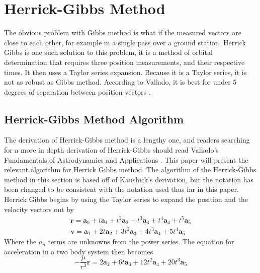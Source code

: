 \documentclass[12pt]{article}
\begin{document}
	\section{Herrick-Gibbs Method}
	The obvious problem with Gibbs method is what if the measured vectors are close to each other, for example in a single pass over a ground station. Herrick Gibbs is one such solution to this problem, it is a method of orbital determination that requires three position measurements, and their respective times. It then uses a Taylor series expansion. Because it is a Taylor series, it is not as robust as Gibbs method. According to Vallado, it is best for under 5 degrees of separation between position vectors \cite{vallado2007fundamentals}.
	
	\subsection{Herrick-Gibbs Method Algorithm}
	The derivation of Herrick-Gibbs method is a lengthy one, and readers searching for a more in depth derivation of Herrick-Gibbs should read Vallado's Fundamentals of Astrodynamics and Applications \cite{vallado2007fundamentals}. This paper will present the relevant algorithm for Herrick Gibbs method. The algorithm of the Herrick-Gibbs method in this section is based off of Kaushick's derivation\cite{Kaushick}, but the notation has been changed to be consistent with the notation used thus far in this paper. Herrick Gibbs begins by using the Taylor series to expand the position and the velocity vectors out by 
	\begin{equation}
	\begin{array} { l } { \mathbf { r } = \mathbf { a } _ { 0 } + t \mathbf { a } _ { 1 } + t ^ { 2 } \mathbf { a } _ { 2 } + t ^ { 3 } \mathbf { a } _ { 3 } + t ^ { 4 } \mathbf { a } _ { 4 } + t ^ { 5 } \mathbf { a } _ { 5 } } \\ { \mathbf { v } = \mathbf { a } _ { 1 } + 2 t \mathbf { a } _ { 2 } + 3 t ^ { 2 } \mathbf { a } _ { 3 } + 4 t ^ { 3 } \mathbf { a } _ { 4 } + 5 t ^ { 4 } \mathbf { a } _ { 5 } } \end{array}
	\end{equation}
	Where the $a_n$ terms are unknowns from the power series. The equation for acceleration in a two body system then becomes
	\begin{equation}
	- \frac { \mu } { r ^ { 3 } } \mathbf { r } = 2 \mathbf { a } _ { 2 } + 6 t \mathbf { a } _ { 3 } + 12 t ^ { 2 } \mathbf { a } _ { 4 } + 20 t ^ { 3 } \mathbf { a } _ { 5 }
	\end{equation}
\end{document}
